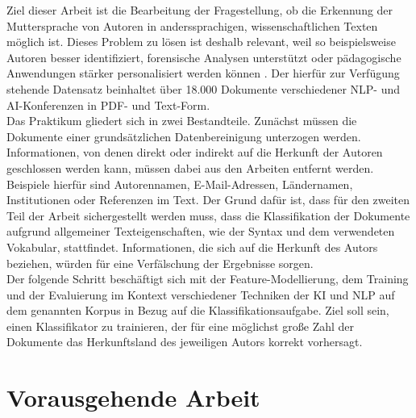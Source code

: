 \documentclass[bachelor,german]{info1thesis}
\begin{document}
Ziel dieser Arbeit ist die Bearbeitung der Fragestellung, ob die Erkennung der Muttersprache von Autoren in anderssprachigen, wissenschaftlichen Texten möglich ist. Dieses Problem zu lösen ist deshalb relevant, weil so beispielsweise Autoren besser identifiziert, forensische Analysen unterstützt oder pädagogische Anwendungen stärker personalisiert werden können \cite{Estival2007,Gibbons2003,Rozovskaya2011}.
Der hierfür zur Verfügung stehende Datensatz beinhaltet über 18.000 Dokumente verschiedener NLP- und AI-Konferenzen in PDF- und Text-Form. \\
Das Praktikum gliedert sich in zwei Bestandteile. Zunächst müssen die Dokumente einer grundsätzlichen Datenbereinigung unterzogen werden. Informationen, von denen direkt oder indirekt auf die Herkunft der Autoren geschlossen werden kann, müssen dabei aus den Arbeiten entfernt werden. Beispiele hierfür sind Autorennamen, E-Mail-Adressen, Ländernamen, Institutionen oder Referenzen im Text. Der Grund dafür ist, dass für den zweiten Teil der Arbeit sichergestellt werden muss, dass die Klassifikation der Dokumente aufgrund allgemeiner Texteigenschaften, wie der Syntax und dem verwendeten Vokabular, stattfindet.
Informationen, die sich auf die Herkunft des Autors beziehen, würden für eine Verfälschung der Ergebnisse sorgen. \\
Der folgende Schritt beschäftigt sich mit der Feature-Modellierung, dem Training und der Evaluierung im Kontext verschiedener Techniken der KI und NLP auf dem genannten Korpus in Bezug auf die Klassifikationsaufgabe. Ziel soll sein, einen Klassifikator zu trainieren, der für eine möglichst große Zahl der Dokumente das Herkunftsland des jeweiligen Autors korrekt vorhersagt. 

\chapter{Vorausgehende Arbeit}
\end{document}
